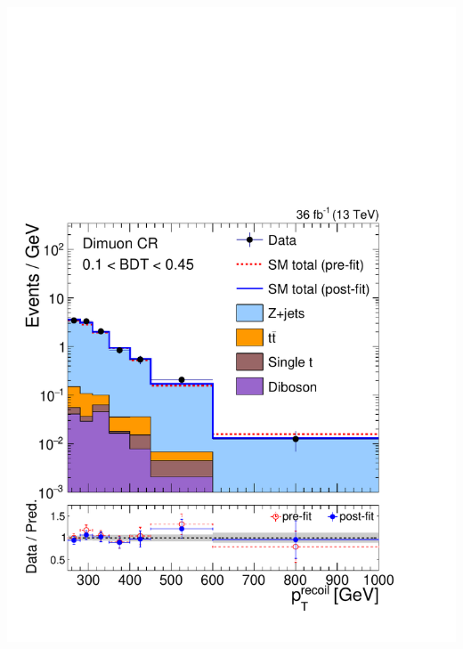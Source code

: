 \documentclass[aspectratio=169,xcolor=dvipsnames,,table,compress]{beamer}
\begin{document}
\begin{frame}[t]
\begin{columns}[T]
\begin{column}{0.125\textwidth}
      \includegraphics[width=\textwidth]{../figures/monotop/postfit/stackedPostfit_dimuon_monotop_loose.pdf}\\ 

\end{column}
\end{columns}
\end{frame}
\end{document}
